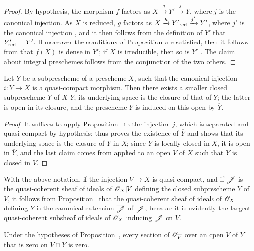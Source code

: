 \begin{proof}
\label{proof-1.9.5.9}
By hypothesis, the morphism $f$ factors as $X\xrightarrow{g}Y'\xrightarrow{j}Y$, where $j$ is the canonical injection.
As $X$ is reduced, $g$ factors as $X\xrightarrow{h} {Y'}_{\mathrm{red}}\xrightarrow{j'}Y'$, where $j'$ is the canonical injection , and it then follows from the definition of $Y'$ that $Y'_{\mathrm{red}}=Y'$.
If moreover the conditions of Proposition  are satisfied, then it follows from  that $f(X)$ is dense in $Y'$; if $X$ is irreducible, then so is $Y'$ .
The claim about integral preschemes follows from the conjunction of the two others.
\end{proof}

\begin{prop}[9.5.10]
\label{1.9.5.10}
Let $Y$ be a subprescheme of a prescheme $X$, such that the canonical injection $i:Y\to X$ is a quasi-compact morphism.
Then there exists a smaller closed subprescheme $\overline{Y}$ of $X$  $Y$; its underlying space is the closure of that of $Y$; the latter is open in its closure, and the prescheme $Y$ is induced on this open by $\overline{Y}$.
\end{prop}

\begin{proof}
\label{proof-1.9.5.10}
It suffices to apply Proposition~ to the injection $j$, which is separated  and quasi-compact by hypothesis;  thus proves the existence of $\overline{Y}$ and  shows that its underlying space is the closure of $Y$ in $X$; since $Y$ is locally closed in $X$, it is open in $\overline{Y}$, and the last claim comes from  applied to an open $V$ of $X$ such that $Y$ is closed in $V$.
\end{proof}

With the above notation, if the injection $V\to X$ is quasi-compact, and if $\mathscr{J}$ is the quasi-coherent sheaf of ideals of $\mathscr{O}_X|V$ defining the closed subprescheme $Y$ of $V$, it follows from Proposition~ that the quasi-coherent sheaf of ideals of $\mathscr{O}_X$ defining $\overline{Y}$ is the canonical extension  $\overline{\mathscr{J}}$ of $\mathscr{J}$, because it is evidently the largest quasi-coherent subsheaf of ideals of $\mathscr{O}_X$ inducing $\mathscr{J}$ on $V$.

\begin{cor}[9.5.11]
\label{1.9.5.11}
Under
the hypotheses of Proposition~, every section of $\mathscr{O}_{\overline{Y}}$ over an open $V$ of $\overline{Y}$ that is zero on $V\cap Y$ is zero.
\end{cor}


